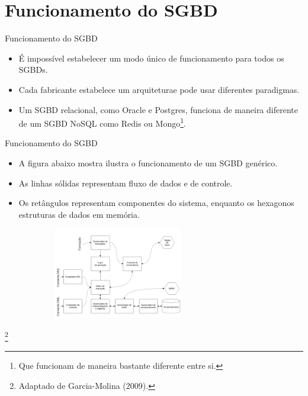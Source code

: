 \documentclass[11pt]{beamer}
\begin{document}
\section{Funcionamento do SGBD}

\begin{frame}{Funcionamento do SGBD}
    \begin{itemize}
        \item É impossível estabelecer um modo único de funcionamento para todos os SGBDs.
        \item Cada fabricante estabelece um arquiteturae pode usar diferentes paradigmas.
        \item Um SGBD relacional, como Oracle e Postgres, funciona de maneira diferente de um SGBD NoSQL como Redis ou Mongo\footnote{Que funcionam de maneira bastante diferente entre si.}.
    \end{itemize}
\end{frame}

\begin{frame}{Funcionamento do SGBD}
    \begin{itemize}
        \item A figura abaixo mostra ilustra o funcionamento de um SGBD genérico.
        \item As linhas sólidas representam fluxo de dados e de controle.
        \item Os retângulos representam componentes do sistema, enquanto os hexagonos estruturas de dados em memória.
    \end{itemize}
    \begin{figure}
        \includegraphics[width=8cm, height=4cm]{figures/database_overview.png}
    \end{figure}\footnote{Adaptado de Garcia-Molina (2009).}
\end{frame}
\end{document}
